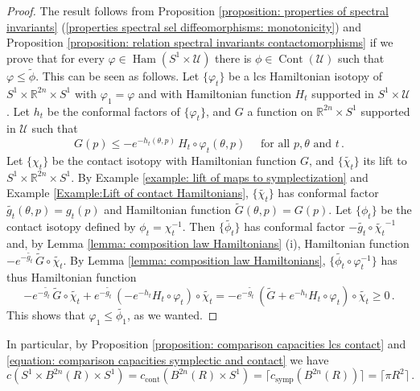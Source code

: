 \documentclass{amsart}
\DeclareMathOperator{\Ham}{Ham}
\DeclareMathOperator{\Cont}{Cont}
\DeclareMathOperator{\symp}{symp}
\DeclareMathOperator{\cont}{cont}
\theoremstyle{remark}
\begin{document}
\begin{proof}
The result follows from Proposition \ref{proposition: properties of spectral invariants}
(\ref{properties spectral sel diffeomorphisms: monotonicity})
and Proposition \ref{proposition: relation spectral invariants contactomorphisms}
if we prove that for every $\varphi \in \Ham (S^1 \times \mathcal{U})$
there is $\phi \in \Cont (\mathcal{U})$
such that $\varphi \leq \widetilde{\phi}$.
This can be seen as follows.
Let $\{\varphi_t\}$ be a lcs Hamiltonian isotopy
of $S^1 \times \mathbb{R}^{2n} \times S^1$
with $\varphi_1 = \varphi$
and with Hamiltonian function $H_t$
supported in $S^1 \times \mathcal{U}$.
Let $h_t$ be the conformal factors of $\{\varphi_t\}$,
and $G$ a function on $\mathbb{R}^{2n} \times S^1$
supported in $\mathcal{U}$ such that
\[
G (p) \leq - e^{-h_t(\theta,p)} \, H_t \circ \varphi_t (\theta, p)
\quad \text{ for all } p, \theta \text{ and } t \,.
\]
Let $\{\chi_t\}$ be the contact isotopy
with Hamiltonian function $G$,
and $\{\widetilde{\chi_t}\}$ its lift to $S^1 \times \mathbb{R}^{2n} \times S^1$.
By Example \ref{example: lift of maps to symplectization}
and Example \ref{Example:Lift of contact Hamiltonians},
$\{\widetilde{\chi_t}\}$ has conformal factor
$\widetilde{g_t} (\theta, p) = g_t(p)$
and Hamiltonian function $\widetilde{G} (\theta, p) = G(p)$.
Let $\{\phi_t\}$ be the contact isotopy defined by $\phi_t = \chi_t^{-1}$.
Then $\{\widetilde{\phi_t}\}$
has conformal factor $- \widetilde{g_t} \circ \widetilde{\chi_t}^{-1}$
and, by Lemma \ref{lemma: composition law Hamiltonians} (i),
Hamiltonian function $- e^{-\widetilde{g_t}} \, \widetilde{G} \circ \widetilde{\chi_t}$.
By Lemma \ref{lemma: composition law Hamiltonians},
$\{\widetilde{\phi_t} \circ \varphi_t^{-1}\}$
has thus Hamiltonian function
\[
- e^{-\widetilde{g_t}} \, \widetilde{G} \circ \widetilde{\chi_t}
+ e^{-\widetilde{g_t}} \, (-e^{-h_t} H_t \circ \varphi_t) \circ \widetilde{\chi_t}
= - e^{-\widetilde{g_t}} \, (\widetilde{G} + e^{-h_t} H_t \circ \varphi_t) \circ \widetilde{\chi_t}
\geq 0 \,.
\]
This shows that $\varphi_1 \leq \widetilde{\phi_1}$,
as we wanted.
\end{proof}

In particular,
by Proposition \ref{proposition: comparison capacities lcs contact}
and \eqref{equation: comparison capacities symplectic and contact}
we have
\begin{equation}\label{equation: capacities balls}
c (S^1 \times B^{2n} (R) \times S^1)
= c_{\cont} (B^{2n} (R) \times S^1)
= \lceil c_{\symp} (B^{2n} (R)) \rceil
= \lceil \pi R^2 \rceil \,.
\end{equation}
\end{document}
